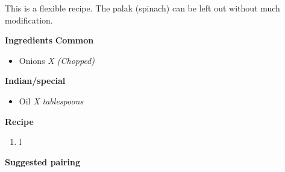 This is a flexible recipe. The palak (spinach) can be left out without much modification.

\large{\textbf{Ingredients}}
  \large{\textbf{Common}}
  \begin{itemize}
    \item Onions \quad\quad\quad\quad \textit{X (Chopped)}
  \end{itemize}
  \large{\textbf{Indian/special}}
  \begin{itemize}
    \item Oil \quad\quad\quad\quad \textit{X tablespoons}
  \end{itemize}

\large{\textbf{Recipe}}

\begin{enumerate}
  \item l
\end{enumerate}

\large{\textbf{Suggested pairing}}
